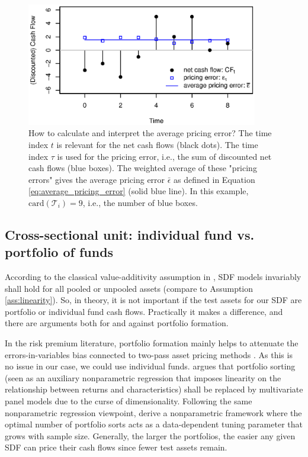 \documentclass[12pt]{article}
\begin{document}
\begin{figure}[ht]
	\centering
	\includegraphics[width=0.9\textwidth]{Figures/spatial/npvs2.eps}
	\caption{
		How to calculate and interpret the average pricing error?
		The time index $t$ is relevant for the net cash flows (black dots).
		The time index $\tau$ is used for the pricing error, i.e., the sum of discounted net cash flows (blue boxes).
		The weighted average of these "pricing errors" gives the average pricing error $\bar{\epsilon}$ as defined in Equation \ref{eq:average_pricing_error} (solid blue line).
		In this example, $\mathrm{card}(\mathcal{T}_{i})=9$, i.e., the number of blue boxes.
	}
	\label{fig:npvs}
\end{figure}

\subsection{Cross-sectional unit: individual fund vs. portfolio of funds}
\label{sec:cross_sectional_unit}

According to the classical value-additivity assumption in \cite{HR87}, SDF models invariably shall hold for all pooled or unpooled assets (compare to Assumption \ref{ass:linearity}).
So, in theory, it is not important if the test assets for our SDF are portfolio or individual fund cash flows.
Practically it makes a difference, and there are arguments both for and against portfolio formation.

In the risk premium literature, portfolio formation mainly helps to attenuate the errors-in-variables bias connected to two-pass asset pricing methods \citep{JNPR19,PRS19}.
As this is no issue in our case, we could use individual funds.
\cite{C11} argues that portfolio sorting (seen as an auxiliary nonparametric regression that imposes linearity on the relationship between returns and characteristics) shall be replaced by multivariate panel models due to the curse of dimensionality.
Following the same nonparametric regression viewpoint, \cite{CCF19} derive a nonparametric framework where the optimal number of portfolio sorts acts as a data-dependent tuning parameter that grows with sample size.
Generally, the larger the portfolios, the easier any given SDF can price their cash flows since fewer test assets remain.
\end{document}
